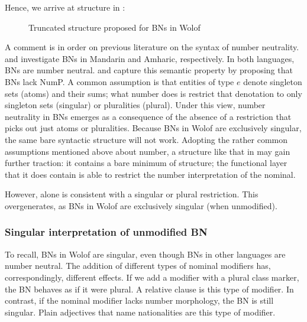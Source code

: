 \documentclass[output=paper]{langscibook}
\begin{document}
Hence, we arrive at structure in :
		
\begin{figure}
    \centering
    \caption{Truncated structure proposed for BNs in Wolof}
    \label{fon:sTrkTBnbN}
\end{figure}
		
A comment is in order on previous literature on the syntax of number neutrality. \citet{rullmannYou2006} and \citet{kramer2017general} investigate BNs in Mandarin and Amharic, respectively. In both languages, BNs are number neutral. \citeauthor{rullmannYou2006} and \citeauthor{kramer2017general} capture this semantic property by proposing that BNs lack NumP. A common assumption is that entities of type $e$ denote singleton sets (atoms) and their sums; what number does is restrict that denotation to only singleton sets (singular) or pluralities (plural). Under this view, number neutrality in BNs emerges as a consequence of the absence of a restriction that picks out just atoms or pluralities. Because BNs in Wolof are exclusively singular, the same bare syntactic structure will not work. Adopting the rather common assumptions mentioned above about number, a structure like that in  may gain further traction: it contains a bare minimum of structure; the functional layer that it does contain is able to restrict the number interpretation of the nominal.

However,  alone is consistent with a singular or plural restriction. This overgenerates, as BNs in Wolof are exclusively singular (when unmodified).
	
\subsubsection{Singular interpretation of unmodified BN}
\label{fon:seK:anAlzS}


	To recall, BNs in Wolof are singular, even though BNs in other languages are number neutral. The addition of different types of nominal modifiers has, correspondingly, different effects. If we add a modifier with a plural class marker, the BN behaves as if it were plural. A relative clause is this type of modifier. In contrast, if the nominal modifier lacks number morphology, the BN is still singular. Plain adjectives that name nationalities are this type of modifier.
			
\end{document}
